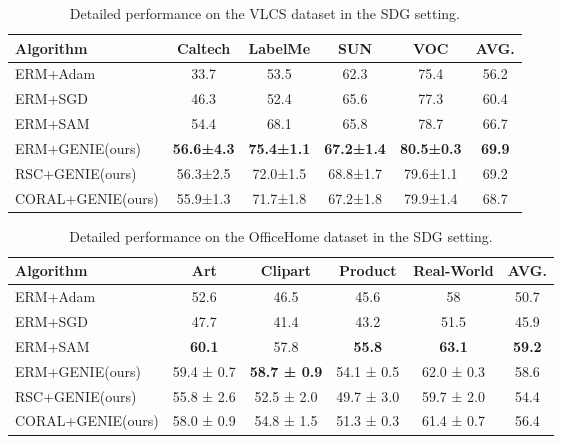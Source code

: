 \documentclass{article}
\theoremstyle{plain}
\theoremstyle{definition}
\theoremstyle{remark}
\begin{document}
\begin{table}[ht]
\caption{Detailed performance on the VLCS dataset in the SDG setting.}
\label{tab:sgd-vlcs}
\vskip 0.15in
\begin{center}
\begin{small}
\begin{sc}
\begin{tabular}{l|cccc|c}
\toprule
 Algorithm & Caltech& LabelMe& SUN& VOC& AVG.\\
\midrule
  ERM+Adam& 33.7& 53.5& 62.3& 75.4&56.2\\
  ERM+SGD& 46.3& 52.4& 65.6& 77.3&60.4\\
  ERM+SAM& 54.4& 68.1& 65.8& 78.7&66.7\\
  ERM+GENIE(ours)& \textbf{56.6\scriptsize{±4.3}}& \textbf{75.4\scriptsize{±1.1}}& \textbf{67.2\scriptsize{±1.4}}& \textbf{80.5\scriptsize{±0.3}}&\textbf{69.9}\\
\midrule
\midrule
RSC+GENIE(ours)& 56.3\scriptsize{±2.5}& 72.0\scriptsize{±1.5}& 68.8\scriptsize{±1.7}& 79.6\scriptsize{±1.1}& 69.2\\
CORAL+GENIE(ours)& 55.9\scriptsize{±1.3}& 71.7\scriptsize{±1.8}& 67.2\scriptsize{±1.8}& 79.9\scriptsize{±1.4}&68.7\\
\bottomrule
\end{tabular}
\end{sc}
\end{small}
\end{center}
\vskip -0.1in
\end{table}

\begin{table}[ht]
\caption{Detailed performance on the OfficeHome dataset in the SDG setting.}
\label{tab:sgd-officehome}
\vskip 0.15in
\begin{center}
\begin{small}
\begin{sc}
\begin{tabular}{l|cccc|c}
\toprule
 Algorithm & Art& Clipart& Product& Real-World& AVG.\\
\midrule
  ERM+Adam& 52.6& 46.5& 45.6& 58&50.7\\
  ERM+SGD& 47.7& 41.4& 43.2& 51.5&45.9\\
  ERM+SAM& \textbf{60.1}& 57.8& \textbf{55.8}& \textbf{63.1}&\textbf{59.2}\\
  ERM+GENIE(ours)& 59.4 \scriptsize{± 0.7}& \textbf{58.7 \scriptsize{± 0.9}}& 54.1 \scriptsize{± 0.5}& 62.0 \scriptsize{± 0.3}&58.6\\
\midrule
\midrule
 RSC+GENIE(ours)& 55.8 \scriptsize{± 2.6}& 52.5 \scriptsize{± 2.0}& 49.7 \scriptsize{± 3.0}& 59.7 \scriptsize{± 2.0}& 54.4\\
  CORAL+GENIE(ours)& 58.0 \scriptsize{± 0.9}& 54.8 \scriptsize{± 1.5}& 51.3 \scriptsize{± 0.3}& 61.4 \scriptsize{± 0.7}
&56.4\\
\bottomrule
\end{tabular}
\end{sc}
\end{small}
\end{center}
\vskip -0.1in
\end{table}
\end{document}
